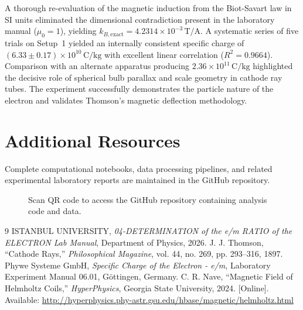 \documentclass[journal]{IEEEtran}
\begin{document}
A thorough re-evaluation of the magnetic induction from the Biot-Savart law in SI units eliminated the dimensional contradiction present in the laboratory manual ($\mu_0 = 1$), yielding $k_{B,\text{exact}} = 4.2314 \times 10^{-3}\,\mathrm{T/A}$. A systematic series of five trials on Setup~1 yielded an internally consistent specific charge of $(6.33 \pm 0.17) \times 10^{10}\,\mathrm{C/kg}$ with excellent linear correlation ($R^2 = 0.9664$). Comparison with an alternate apparatus producing $2.36 \times 10^{11}\,\mathrm{C/kg}$ highlighted the decisive role of spherical bulb parallax and scale geometry in cathode ray tubes. The experiment successfully demonstrates the particle nature of the electron and validates Thomson's magnetic deflection methodology.

\section{Additional Resources}
Complete computational notebooks, data processing pipelines, and related experimental laboratory reports are maintained in the GitHub repository.

\begin{figure}[H]
    \centering
    \begin{minipage}{0.15\textwidth}
        \centering
    \end{minipage}%
    \begin{minipage}{0.2\textwidth}
        \raggedright
        \caption{Scan QR code to access the GitHub repository containing analysis code and data.}
        \label{fig:qr_code}
    \end{minipage}
\end{figure}

\begin{thebibliography}{9}
    ISTANBUL UNIVERSITY, \textit{04-DETERMINATION of the e/m RATIO of the ELECTRON Lab Manual}, Department of Physics, 2026.
    J. J. Thomson, ``Cathode Rays,'' \textit{Philosophical Magazine}, vol. 44, no. 269, pp. 293--316, 1897.
    Phywe Systeme GmbH, \textit{Specific Charge of the Electron - e/m}, Laboratory Experiment Manual 06.01, Göttingen, Germany.
    C. R. Nave, ``Magnetic Field of Helmholtz Coils,'' \textit{HyperPhysics}, Georgia State University, 2024. [Online]. Available: \url{http://hyperphysics.phy-astr.gsu.edu/hbase/magnetic/helmholtz.html}
\end{thebibliography}
\end{document}
